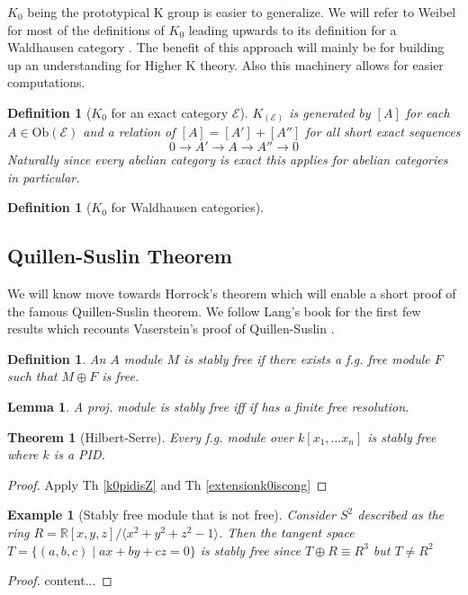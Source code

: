 \documentclass[12pt]{article}
\numberwithin{equation}{section}
\newcounter{dummy} \numberwithin{dummy}{section}
\newtheorem{theorem}[dummy]{Theorem}
\newtheorem{definition}[dummy]{Definition}
\newtheorem{lemma}[dummy]{Lemma}
\newtheorem{example}[dummy]{Example}
\begin{document}
	$K_0$ being the prototypical K group is easier to generalize. We will refer to Weibel for most of the definitions of $K_0$ leading upwards to its definition for a Waldhausen category \cite{weibel2013k}. The benefit of this approach will mainly be for building up an understanding for Higher K theory. Also this machinery allows for easier computations.
	
	\begin{definition}[$K_0$ for an exact category $\mathcal{E}$]
		$K_(\mathcal E)$ is generated by $[A]$ for each $A \in \mathrm{Ob}(\mathcal{E})$ and a relation of $[A]=[A']+[A'']$ for all short exact sequences \[ 0 \to A' \to A \to A'' \to 0 \]
		Naturally since every abelian category is exact this applies for abelian categories in particular.
	\end{definition}
	
	\begin{definition}[$K_0$ for Waldhausen categories]
		
	\end{definition}
	
	
	
	\subsection{Quillen-Suslin Theorem}
	We will know move towards Horrock's theorem which will enable a short proof of the famous Quillen-Suslin theorem. We follow Lang's book for the first few results which recounts Vaserstein's proof of Quillen-Suslin \cite{lang02}.
	
	\begin{definition}
	An $A$ module $M$ is stably free if there exists a f.g. free module $F$ such that $M \oplus F$ is free.
	\end{definition}
	\begin{lemma}
	A proj. module is stably free iff if has a finite free resolution.
	\end{lemma}
	\begin{theorem}[Hilbert-Serre]
	Every f.g. module over $k[x_1,\dots x_n]$ is stably free where $k$ is a PID.
	\end{theorem}
	\begin{proof}
		Apply Th \ref{k0pidisZ} and Th \ref{extensionk0iscong}
	\end{proof}
	\begin{example}[Stably free module that is not free]
		Consider $S^2$ described as the ring $R=\mathbb{R}[x,y,z]/\langle x^2+y^2+z^2-1 \rangle $. Then the tangent space $T=\{ (a,b,c) \mid ax+by+cz=0  \}$ is stably free since $T \oplus R \equiv R^3 $ but $T \neq R^2$
	\end{example}
	\begin{proof}
		content...
	\end{proof}
	
\end{document}
